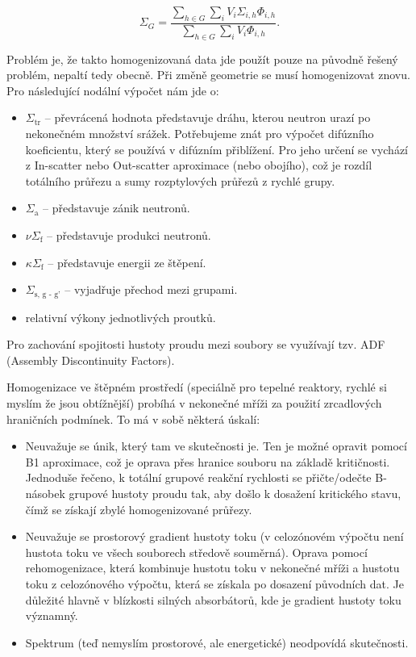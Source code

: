 \begin{equation}
  \boxed{
    \Sigma_G = \dfrac{\sum_{h \in G} \sum_i V_i \Sigma_{i,h} \Phi_{i,h}}{\sum_{h \in G} \sum_i V_i \Phi_{i,h}}.}
\end{equation}

Problém je, že takto homogenizovaná data jde použít pouze na původně řešený problém, nepaltí tedy obecně. Při změně geometrie se musí homogenizovat znovu. Pro následující nodální výpočet nám jde o:

\begin{itemize}
  \item $\Sigma_\text{tr}$ -- převrácená hodnota představuje dráhu, kterou neutron urazí po nekonečném množství srážek. Potřebujeme znát pro výpočet difúzního koeficientu, který se používá v difúzním přiblížení. Pro jeho určení se vychází z In-scatter nebo Out-scatter aproximace (nebo obojího), což je rozdíl totálního průřezu a sumy rozptylových průřezů z rychlé grupy.
  \item $\Sigma_\text{a}$ -- představuje zánik neutronů.
  \item $\nu \Sigma_\text{f}$ -- představuje produkci neutronů.
  \item $\kappa \Sigma_\text{f}$ -- představuje energii ze štěpení.
  \item $\Sigma_\text{s, g - g'}$ -- vyjadřuje přechod mezi grupami. 
  \item relativní výkony jednotlivých proutků.
\end{itemize}

Pro zachování spojitosti hustoty proudu mezi soubory se využívají tzv. ADF (Assembly Discontinuity Factors).

Homogenizace ve štěpném prostředí (speciálně pro tepelné reaktory, rychlé si myslím že jsou obtížnější) probíhá v nekonečné mříži za použití zrcadlových hraničních podmínek. To má v sobě některá úskalí:

\begin{itemize}
  \item Neuvažuje se únik, který tam ve skutečnosti je. Ten je možné opravit pomocí B1 aproximace, což je oprava přes hranice souboru na základě kritičnosti. Jednoduše řečeno, k totální grupové reakční rychlosti se přičte/odečte B-násobek grupové hustoty proudu tak, aby došlo k dosažení kritického stavu, čímž se získají zbylé homogenizované průřezy.
  \item Neuvažuje se prostorový gradient hustoty toku (v celozónovém výpočtu není hustota toku ve všech souborech středově souměrná). Oprava pomocí rehomogenizace, která kombinuje hustotu toku v nekonečné mříži a hustotu toku z celozónového výpočtu, která se získala po dosazení původních dat. Je důležité hlavně v blízkosti silných absorbátorů, kde je gradient hustoty toku významný.
  \item Spektrum (teď nemyslím prostorové, ale energetické) neodpovídá skutečnosti.
\end{itemize}

